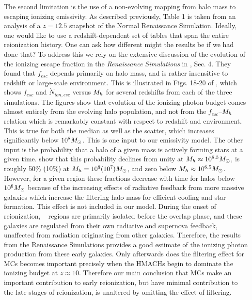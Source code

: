 \documentclass[iop,apj]{emulateapj}
\begin{document}
The second limitation is the use of a non-evolving mapping from halo mass to escaping ionizing emissivity. As described previously, Table 1 is taken from an analysis of a $z=12.5$ snapshot of the Normal Renaissance Simulation. Ideally, one would like to use a redshift-dependent set of tables that span the entire reionization history. One can ask how different might the results be if we had done that? To address this we rely on the extensive discussion of the evolution of the ionizing escape fraction in the {\it Renaissance Simulations} in \cite{Xu16}, Sec. 4. They found that $f_{esc}$ depends primarily on halo mass, and is rather insensitive to redshift or large-scale environment. This is illustrated in Figs. 18-20 of \cite{Xu16}, which shows $f_{esc}$ and $\dot{N}_{ion,esc}$ versus $M_h$ for several redshifts from each of the three simulations. The figures show that evolution of the ionizing photon budget comes almost entirely from the evolving halo population, and not from the $f_{esc}$--$M_h$ relation which is remarkably constant with respect to redshift and environment. This is true for both the median as well as the scatter, which increases significantly below $10^8\Ms$. This is one input to our emissivity model. The other input is the probability that a halo of a given mass is actively forming stars at a given time. \cite{Xu16} show that this probability declines from unity at $\mh \approx 10^{8.5}\Ms$, is roughly 50\% (10\%) at $\mh =10^{8} (10^7)\Ms$, and zero below $\mh \approx 10^{6.5}\Ms$. However, for a given region these fractions decrease with time for halos below $10^8\Ms$ because of the increasing effects of radiative feedback from more massive galaxies which increase the filtering halo mass for efficient cooling and star formation. This effect is not included in our model. During the onset of reionization, \hii~ regions are primarily isolated before the overlap phase, and these galaxies are regulated from their own radiative and supernova feedback, unaffected from radiation originating from other galaxies. Therefore, the results from the Renaissance Simulations provides a good estimate of the ionizing photon production from these early galaxies. Only afterwards does the filtering effect for MCs becomes important precisely when the HMACHs begin to dominate the ionizing budget at $z \approx 10$. Therefore our main conclusion that MCs make an important contribution to early reionization, but have minimal contribution to the late stages of reionization, is unaltered by omitting the effect of filtering.
\end{document}
